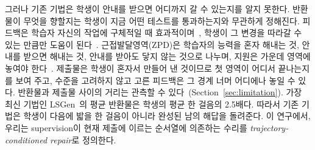 \documentclass[10pt,conference]{IEEEtran}
\begin{document}
그러나 기존 기법은 학생이 안내를 받으면 어디까지 갈 수 있는지를 알지 못한다. 반환물이 무엇을 향할지는 학생이 지금 어떤 테스트를 통과하는지와 무관하게 정해진다. 피드백은 학습자 자신의 작업에 구체적일 때 효과적이며~\cite{hattie2007power,shute2008focus}, 학생이 그 변경을 따라갈 수 있는 만큼만 도움이 된다~\cite{narciss2008feedback,aleven2000limitations}. 근접발달영역(ZPD)은 학습자의 능력을 혼자 해내는 것, 안내를 받으면 해내는 것, 안내를 받아도 닿지 않는 것으로 나누며, 지원은 가운데 영역에 놓여야 한다~\cite{cole1978mind}. 제출물은 학생이 혼자서 만들어 낸 것이므로 첫 영역이 어디서 끝나는지를 보여 주고, 수준을 고려하지 않고 고른 피드백은 그 경계 너머 어디에나 놓일 수 있다. 반환물과 제출물 사이의 거리는 관측할 수 있다~\cite{murray2002toward,chounta2017grey,schulze2024beyond}(Section~\ref{sec:limitation}). 가장 최신 기법인 LSGen~\cite{dai2026learner}의 평균 반환물은 학생의 평균 한 걸음의 2.5배다. 따라서 기존 기법은 학생이 다음에 밟을 한 걸음이 아니라 완성된 남의 해답을 돌려준다. 이 연구에서, 우리는 supervision이 현재 제출에 이르는 순서열에 의존하는 수리를 \emph{trajectory-conditioned repair}로 정의한다.
\end{document}

